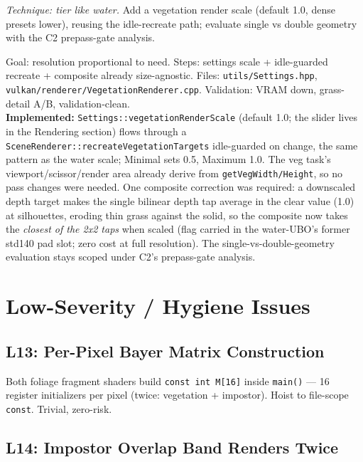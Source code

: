 \documentclass[11pt,a4paper]{article}
\begin{document}
\textit{Technique: tier like water.} Add a vegetation render scale (default
1.0, dense presets lower), reusing the idle-recreate path; evaluate single
vs double geometry with the C2 prepass-gate analysis.

\begin{tcolorbox}[promptbox={Prompt --- M12: tier vegetation resolution}]
Goal: resolution proportional to need. Steps: settings scale +
idle-guarded recreate + composite already size-agnostic. Files:
\texttt{utils/Settings.hpp},
\texttt{vulkan/renderer/VegetationRenderer.cpp}. Validation: VRAM down,
grass-detail A/B, validation-clean.
\\ \textbf{Implemented:} \texttt{Settings::vegetationRenderScale}
(default 1.0; the slider lives in the Rendering section) flows through a
\texttt{SceneRenderer::recreateVegetationTargets} idle-guarded on change, the
same pattern as the water scale; Minimal sets 0.5, Maximum 1.0. The veg
task's viewport/scissor/render area already derive from
\texttt{getVegWidth/Height}, so no pass changes were needed. One composite
correction was required: a downscaled depth target makes the single
bilinear depth tap average in the clear value (1.0) at silhouettes, eroding
thin grass against the solid, so the composite now takes the
\emph{closest of the 2x2 taps} when scaled (flag carried in the water-UBO's
former std140 pad slot; zero cost at full resolution). The
single-vs-double-geometry evaluation stays scoped under C2's prepass-gate
analysis.
\end{tcolorbox}

\section{Low-Severity / Hygiene Issues}

\subsection{L13: Per-Pixel Bayer Matrix Construction}
\label{sec:l13}

Both foliage fragment shaders build \texttt{const int M[16]} inside
\texttt{main()} --- 16 register initializers per pixel (twice: vegetation +
impostor). Hoist to file-scope \texttt{const}. Trivial, zero-risk.

\subsection{L14: Impostor Overlap Band Renders Twice}
\label{sec:l14}
\end{document}
